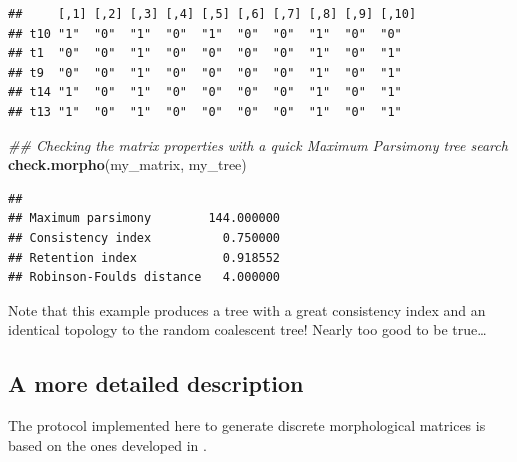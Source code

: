 \documentclass[]{book}
\newenvironment{Shaded}{\begin{snugshade}}{\end{snugshade}}
\newcommand{\CommentTok}[1]{\textcolor[rgb]{0.56,0.35,0.01}{\textit{#1}}}
\newcommand{\KeywordTok}[1]{\textcolor[rgb]{0.13,0.29,0.53}{\textbf{#1}}}
\newcommand{\NormalTok}[1]{#1}
\begin{document}
\begin{verbatim}
##     [,1] [,2] [,3] [,4] [,5] [,6] [,7] [,8] [,9] [,10]
## t10 "1"  "0"  "1"  "0"  "1"  "0"  "0"  "1"  "0"  "0"  
## t1  "0"  "0"  "1"  "0"  "0"  "0"  "0"  "1"  "0"  "1"  
## t9  "0"  "0"  "1"  "0"  "0"  "0"  "0"  "1"  "0"  "1"  
## t14 "1"  "0"  "1"  "0"  "0"  "0"  "0"  "1"  "0"  "1"  
## t13 "1"  "0"  "1"  "0"  "0"  "0"  "0"  "1"  "0"  "1"
\end{verbatim}

\begin{Shaded}
\begin{Highlighting}[]
\CommentTok{## Checking the matrix properties with a quick Maximum Parsimony tree search}
\KeywordTok{check.morpho}\NormalTok{(my_matrix, my_tree)}
\end{Highlighting}
\end{Shaded}

\begin{verbatim}
##                                    
## Maximum parsimony        144.000000
## Consistency index          0.750000
## Retention index            0.918552
## Robinson-Foulds distance   4.000000
\end{verbatim}

Note that this example produces a tree with a great consistency index and an identical topology to the random coalescent tree!
Nearly too good to be true\ldots{}

\hypertarget{a-more-detailed-description}{%
\subsection{A more detailed description}\label{a-more-detailed-description}}

The protocol implemented here to generate discrete morphological matrices is based on the ones developed in \citep{GuillermeCooper, OReilly2016, puttick2017uncertain, OReilly2017}.
\end{document}
